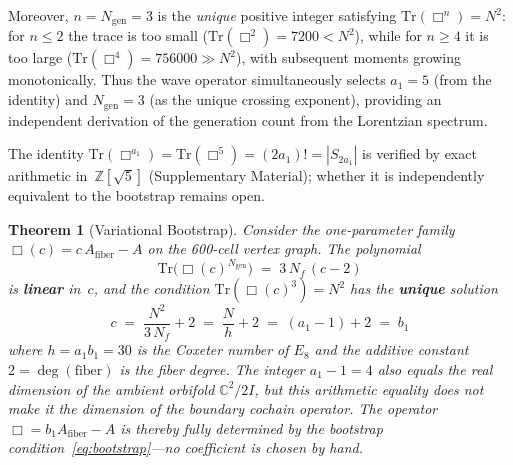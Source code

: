 \documentclass[12pt,a4paper]{article}
\newtheorem{theorem}{Theorem}
\theoremstyle{definition}
\begin{document}
Moreover, $n = N_{\mathrm{gen}} = 3$ is the \emph{unique} positive integer satisfying $\mathrm{Tr}(\Box^n) = N^2$: for $n \le 2$ the trace is too small ($\mathrm{Tr}(\Box^2) = 7200 < N^2$), while for $n \ge 4$ it is too large ($\mathrm{Tr}(\Box^4) = 756000 \gg N^2$), with subsequent moments growing monotonically.  Thus the wave operator simultaneously selects $a_1 = 5$ (from the identity) and $N_{\mathrm{gen}} = 3$ (as the unique crossing exponent), providing an independent derivation of the generation count from the Lorentzian spectrum.

The identity $\mathrm{Tr}(\Box^{a_1}) = \mathrm{Tr}(\Box^5) = (2a_1)! = |S_{2a_1}|$ is verified by exact arithmetic in~$\mathbb{Z}[\sqrt{5}]$ (Supplementary Material); whether it is independently equivalent to the bootstrap remains open.

\begin{theorem}[Variational Bootstrap]\label{thm:variational_bootstrap}
Consider the one-parameter family $\Box(c) = c\, A_{\mathrm{fiber}} - A$ on the 600-cell vertex graph.  The polynomial
\begin{equation}
\mathrm{Tr}\!\big(\Box(c)^{N_{\mathrm{gen}}}\big) \;=\; 3\,N_f\,(c - 2)
\label{eq:variational_linear}
\end{equation}
is \textbf{linear} in~$c$, and the condition $\mathrm{Tr}(\Box(c)^3) = N^2$ has the \textbf{unique} solution
\begin{equation}
\boxed{c \;=\; \frac{N^2}{3\,N_f} + 2 \;=\; \frac{N}{h} + 2 \;=\; (a_1-1)+2 \;=\; b_1}
\label{eq:variational_c}
\end{equation}
where $h = a_1 b_1 = 30$ is the Coxeter number of $E_8$ and the additive constant $2 = \deg(\text{fiber})$ is the fiber degree.  The integer $a_1-1=4$ also equals the real dimension of the ambient orbifold $\mathbb C^2/2I$, but this arithmetic equality does not make it the dimension of the boundary cochain operator.  The operator $\Box = b_1 A_{\mathrm{fiber}} - A$ is thereby fully determined by the bootstrap condition~\eqref{eq:bootstrap}---no coefficient is chosen by hand.
\end{theorem}
\end{document}
